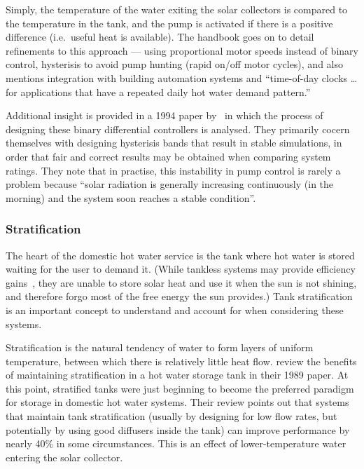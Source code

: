 Simply, the temperature of the water exiting the solar collectors is compared to the temperature in the tank, and the pump is activated if there is a positive difference (i.e.\ useful heat is available).
The handbook goes on to detail refinements to this approach --- using proportional motor speeds instead of binary control, hysterisis to avoid pump hunting (rapid on/off motor cycles), and also mentions integration with building automation systems and ``time-of-day clocks \ldots for applications that have a repeated daily hot water demand pattern.''

Additional insight is provided in a 1994 paper by~\textcite{Beckman94} in which the process of designing these binary differential controllers is analysed.
They primarily cocern themselves with designing hysterisis bands that result in stable simulations, in order that fair and correct results may be obtained when comparing system ratings.
They note that in practise, this instability in pump control is rarely a problem because ``solar radiation is generally increasing continuously (in the morning) and the system soon reaches a stable condition''.

\subsubsection{Stratification}
\label{sec:background:stratification}

The heart of the domestic hot water service is the tank where hot water is stored waiting for the user to demand it.
(While tankless systems may provide efficiency gains~\cite{DuffBradnum13}, they are unable to store solar heat and use it when the sun is not shining, and therefore forgo most of the free energy the sun provides.)
Tank stratification is an important concept to understand and account for when considering these systems.

Stratification is the natural tendency of water to form layers of uniform temperature, between which there is relatively little heat flow.
\textcite{Hollands89} review the benefits of maintaining stratification in a hot water storage tank in their 1989 paper.
At this point, stratified tanks were just beginning to become the preferred paradigm for storage in domestic hot water systems.
Their review points out that systems that maintain tank stratification (usually by designing for low flow rates, but potentially by using good diffusers inside the tank) can improve performance by nearly 40\% in some circumstances.
This is an effect of lower-temperature water entering the solar collector.

